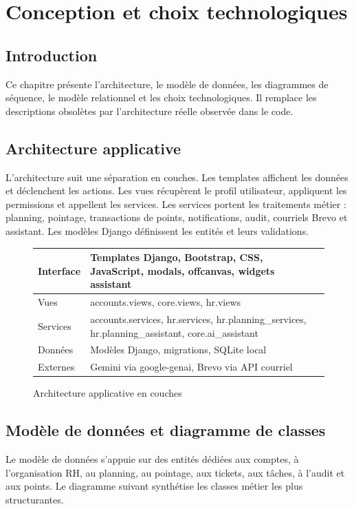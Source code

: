 \documentclass[12pt,a4paper]{report}
\begin{document}
\chapter{Conception et choix technologiques}
\section{Introduction}
Ce chapitre présente l'architecture, le modèle de données, les diagrammes de séquence, le modèle relationnel et les choix technologiques. Il remplace les descriptions obsolètes par l'architecture réelle observée dans le code.

\section{Architecture applicative}
L'architecture suit une séparation en couches. Les templates affichent les données et déclenchent les actions. Les vues récupèrent le profil utilisateur, appliquent les permissions et appellent les services. Les services portent les traitements métier : planning, pointage, transactions de points, notifications, audit, courriels Brevo et assistant. Les modèles Django définissent les entités et leurs validations.


\begin{figure}[h!]
\centering
\renewcommand{\arraystretch}{1.25}
\begin{tabular}{|>{\centering\arraybackslash}p{4cm}|>{\centering\arraybackslash}p{10cm}|}
\hline
Interface & Templates Django, Bootstrap, CSS, JavaScript, modals, offcanvas, widgets assistant \\ \hline
Vues & accounts.views, core.views, hr.views \\ \hline
Services & accounts.services, hr.services, hr.planning\_services, hr.planning\_assistant, core.ai\_assistant \\ \hline
Données & Modèles Django, migrations, SQLite local \\ \hline
Externes & Gemini via google-genai, Brevo via API courriel \\ \hline
\end{tabular}
\caption{Architecture applicative en couches}
\label{fig:architecture}
\end{figure}


\section{Modèle de données et diagramme de classes}
Le modèle de données s'appuie sur des entités dédiées aux comptes, à l'organisation RH, au planning, au pointage, aux tickets, aux tâches, à l'audit et aux points. Le diagramme suivant synthétise les classes métier les plus structurantes.
\end{document}
